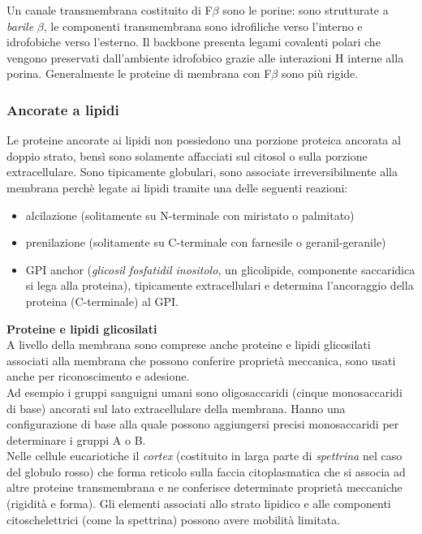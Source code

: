             Un canale transmembrana costituito di F$\beta$ sono le porine: sono strutturate a \textit{barile} $\beta$, le componenti transmembrana sono idrofiliche verso l'interno e idrofobiche verso l'esterno. 
            Il backbone presenta legami covalenti polari che vengono preservati dall'ambiente idrofobico grazie alle interazioni H interne alla porina. Generalmente le proteine di membrana con F$\beta$ sono più rigide.
            
        \subsubsection{Ancorate a lipidi}
            Le proteine ancorate ai lipidi non possiedono una porzione proteica ancorata al doppio strato, bensì sono solamente affacciati sul citosol o sulla porzione extracellulare.
            Sono tipicamente globulari, sono associate irreversibilmente alla membrana perchè legate ai lipidi tramite una delle seguenti reazioni:
            \begin{itemize}
                \item alcilazione (solitamente su N-terminale con miristato o palmitato)
                \item prenilazione (solitamente su C-terminale con farnesile o geranil-geranile)
                \item GPI anchor (\textit{glicosil fosfatidil inositolo}, un glicolipide, componente saccaridica si lega alla proteina), tipicamente extracellulari e determina l'ancoraggio della proteina (C-terminale) al GPI.
            \end{itemize}
            \textbf{Proteine e lipidi glicosilati}\\
                A livello della membrana sono comprese anche proteine e lipidi glicosilati associati alla membrana che possono conferire proprietà meccanica, sono usati anche per riconoscimento e adesione. \\
                Ad esempio i gruppi sanguigni umani sono oligosaccaridi (cinque monosaccaridi di base) ancorati sul lato extracellulare della membrana. Hanno una configurazione di base alla quale possono aggiungersi precisi monosaccaridi per determinare i gruppi A o B. \\
                Nelle cellule eucariotiche il \textit{cortex} (costituito in larga parte di \textit{spettrina} nel caso del globulo rosso) che forma reticolo sulla faccia citoplasmatica che si associa ad altre proteine transmembrana e ne conferisce determinate proprietà meccaniche (rigidità e forma). Gli elementi associati allo strato lipidico e alle componenti citoschelettrici (come la spettrina) possono avere mobilità limitata.
            
